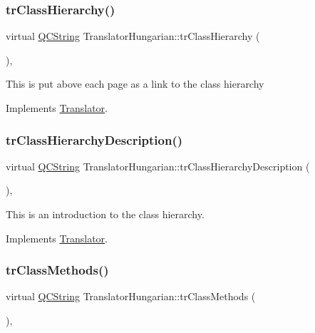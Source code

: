 \subsubsection{\texorpdfstring{trClassHierarchy()}{trClassHierarchy()}}
{\footnotesize\ttfamily virtual \mbox{\hyperlink{class_q_c_string}{Q\+C\+String}} Translator\+Hungarian\+::tr\+Class\+Hierarchy (\begin{DoxyParamCaption}{ }\end{DoxyParamCaption})\hspace{0.3cm}{\ttfamily [inline]}, {\ttfamily [virtual]}}

This is put above each page as a link to the class hierarchy 

Implements \mbox{\hyperlink{class_translator}{Translator}}.

\mbox{\label{class_translator_hungarian_a1bb917f97a6fd02877fc43581f7b09a8}} 
\subsubsection{\texorpdfstring{trClassHierarchyDescription()}{trClassHierarchyDescription()}}
{\footnotesize\ttfamily virtual \mbox{\hyperlink{class_q_c_string}{Q\+C\+String}} Translator\+Hungarian\+::tr\+Class\+Hierarchy\+Description (\begin{DoxyParamCaption}{ }\end{DoxyParamCaption})\hspace{0.3cm}{\ttfamily [inline]}, {\ttfamily [virtual]}}

This is an introduction to the class hierarchy. 

Implements \mbox{\hyperlink{class_translator}{Translator}}.

\mbox{\label{class_translator_hungarian_a6e64d88438d6ec6566175817ba3ecc93}} 
\subsubsection{\texorpdfstring{trClassMethods()}{trClassMethods()}}
{\footnotesize\ttfamily virtual \mbox{\hyperlink{class_q_c_string}{Q\+C\+String}} Translator\+Hungarian\+::tr\+Class\+Methods (\begin{DoxyParamCaption}{ }\end{DoxyParamCaption})\hspace{0.3cm}{\ttfamily [inline]}, {\ttfamily [virtual]}}

